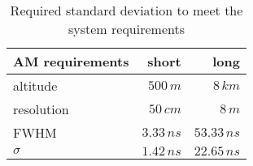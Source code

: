 \begin{table}[H]
\centering
\caption{Required standard deviation to meet the system requirements}
\label{tab:AM_requirements}
\begin{tabular}{|l|rr|}\hline
    \textbf{AM requirements} & short & long \\
    \hline 
    altitude & $500\,m$ & $8\,km$ \\
    resolution & $50\,cm$ & $8\,m$ \\
    FWHM & $3.33\,n s$ & $53.33\,n s$ \\
    $\sigma$ & $1.42\,n s$ & $22.65\,n s$ \\
    \hline 
\end{tabular}
\end{table}
